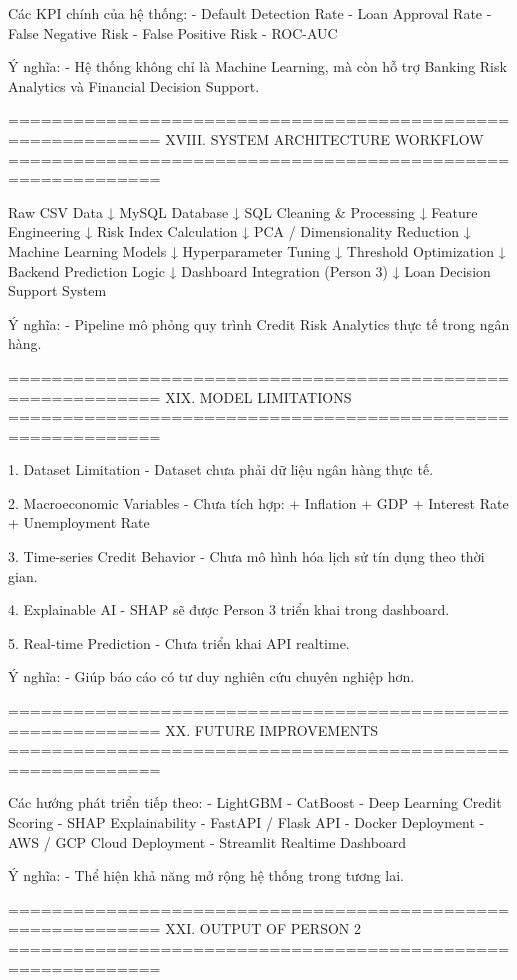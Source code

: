Các KPI chính của hệ thống:
- Default Detection Rate
- Loan Approval Rate
- False Negative Risk
- False Positive Risk
- ROC-AUC

Ý nghĩa:
- Hệ thống không chỉ là Machine Learning,
  mà còn hỗ trợ Banking Risk Analytics và Financial Decision Support.

============================================================
XVIII. SYSTEM ARCHITECTURE WORKFLOW
============================================================

Raw CSV Data
        ↓
MySQL Database
        ↓
SQL Cleaning & Processing
        ↓
Feature Engineering
        ↓
Risk Index Calculation
        ↓
PCA / Dimensionality Reduction
        ↓
Machine Learning Models
        ↓
Hyperparameter Tuning
        ↓
Threshold Optimization
        ↓
Backend Prediction Logic
        ↓
Dashboard Integration (Person 3)
        ↓
Loan Decision Support System

Ý nghĩa:
- Pipeline mô phỏng quy trình Credit Risk Analytics thực tế trong ngân hàng.

============================================================
XIX. MODEL LIMITATIONS
============================================================

1. Dataset Limitation
- Dataset chưa phải dữ liệu ngân hàng thực tế.

2. Macroeconomic Variables
- Chưa tích hợp:
  + Inflation
  + GDP
  + Interest Rate
  + Unemployment Rate

3. Time-series Credit Behavior
- Chưa mô hình hóa lịch sử tín dụng theo thời gian.

4. Explainable AI
- SHAP sẽ được Person 3 triển khai trong dashboard.

5. Real-time Prediction
- Chưa triển khai API realtime.

Ý nghĩa:
- Giúp báo cáo có tư duy nghiên cứu chuyên nghiệp hơn.

============================================================
XX. FUTURE IMPROVEMENTS
============================================================

Các hướng phát triển tiếp theo:
- LightGBM
- CatBoost
- Deep Learning Credit Scoring
- SHAP Explainability
- FastAPI / Flask API
- Docker Deployment
- AWS / GCP Cloud Deployment
- Streamlit Realtime Dashboard

Ý nghĩa:
- Thể hiện khả năng mở rộng hệ thống trong tương lai.

============================================================
XXI. OUTPUT OF PERSON 2
============================================================

